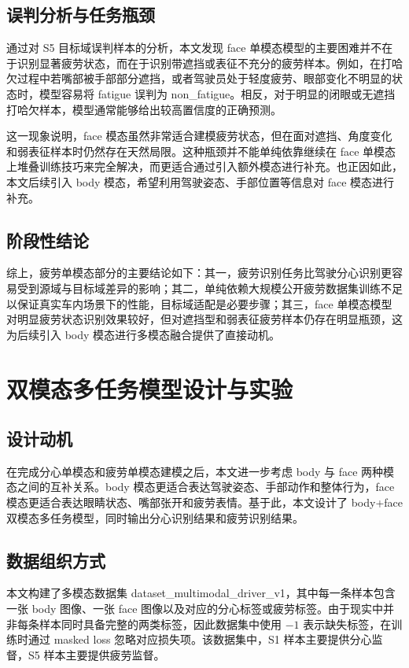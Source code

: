 \documentclass[12pt]{ctexrep}
\begin{document}
\section{误判分析与任务瓶颈}
通过对 S5 目标域误判样本的分析，本文发现 face 单模态模型的主要困难并不在于识别显著疲劳状态，而在于识别带遮挡或表征不充分的疲劳样本。例如，在打哈欠过程中若嘴部被手部部分遮挡，或者驾驶员处于轻度疲劳、眼部变化不明显的状态时，模型容易将 fatigue 误判为 non\_fatigue。相反，对于明显的闭眼或无遮挡打哈欠样本，模型通常能够给出较高置信度的正确预测。

这一现象说明，face 模态虽然非常适合建模疲劳状态，但在面对遮挡、角度变化和弱表征样本时仍然存在天然局限。这种瓶颈并不能单纯依靠继续在 face 单模态上堆叠训练技巧来完全解决，而更适合通过引入额外模态进行补充。也正因如此，本文后续引入 body 模态，希望利用驾驶姿态、手部位置等信息对 face 模态进行补充。

\section{阶段性结论}
综上，疲劳单模态部分的主要结论如下：其一，疲劳识别任务比驾驶分心识别更容易受到源域与目标域差异的影响；其二，单纯依赖大规模公开疲劳数据集训练不足以保证真实车内场景下的性能，目标域适配是必要步骤；其三，face 单模态模型对明显疲劳状态识别效果较好，但对遮挡型和弱表征疲劳样本仍存在明显瓶颈，这为后续引入 body 模态进行多模态融合提供了直接动机。

\chapter{双模态多任务模型设计与实验}

\section{设计动机}
在完成分心单模态和疲劳单模态建模之后，本文进一步考虑 body 与 face 两种模态之间的互补关系。body 模态更适合表达驾驶姿态、手部动作和整体行为，face 模态更适合表达眼睛状态、嘴部张开和疲劳表情。基于此，本文设计了 body+face 双模态多任务模型，同时输出分心识别结果和疲劳识别结果。

\section{数据组织方式}
本文构建了多模态数据集 dataset\_multimodal\_driver\_v1，其中每一条样本包含一张 body 图像、一张 face 图像以及对应的分心标签或疲劳标签。由于现实中并非每条样本同时具备完整的两类标签，因此数据集中使用 $-1$ 表示缺失标签，在训练时通过 masked loss 忽略对应损失项。该数据集中，S1 样本主要提供分心监督，S5 样本主要提供疲劳监督。
\end{document}
